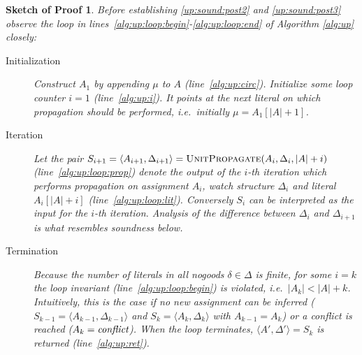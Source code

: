 \documentclass{vutinfth} %
\newtheorem{proof-sketch}{Sketch of Proof}[chapter]
\newcommand{\ass}{A}
\newcommand{\dpm}{\Delta^\pm}
\newcommand{\sgl}{\mu}
\begin{document}
\begin{proof-sketch}


Before establishing \ref{up:sound:post2} and \ref{up:sound:post3} observe the loop in lines~\ref{alg:up:loop:begin}-\ref{alg:up:loop:end} of Algorithm \ref{alg:up} closely:
\begin{description}
\item[Initialization] Construct $A_1$ by appending $\sgl$ to $\ass$ (line~\ref{alg:up:circ}). Initialize some loop counter $i = 1$ (line~\ref{alg:up:i}). It points at the next literal on which propagation should be performed, i.e.~initially $\sgl = \ass_1[|\ass| + 1]$. 

\item[Iteration] Let the pair $S_{i+1} = \langle \ass_{i+1}, \Delta_{i+1} \rangle = \textsc{UnitPropagate}(\ass_i, \Delta_i, |A| + i)$ (line~\ref{alg:up:loop:prop}) denote the output of the $i$-th iteration which performs propagation on assignment $\ass_i$, watch structure $\Delta_i$ and literal $\ass_i[|A| + i]$ (line~\ref{alg:up:loop:lit}). Conversely $S_i$ can be interpreted as the input for the $i$-th iteration. Analysis of the difference between $\Delta_{i}$ and $\Delta_{i+1}$ is what resembles soundness below.

\item[Termination] Because the number of literals in all nogoods $\delta \in \Delta$ is finite, for some $i = k$ the loop invariant (line~\ref{alg:up:loop:begin}) is violated, i.e.~$|\ass_{k}| < |A| + k$. Intuitively, this is the case if no new assignment can be inferred ($S_{k-1} = \langle \ass_{k-1}, \Delta_{k-1} \rangle$ and $S_k = \langle \ass_k, \Delta_k \rangle$ with $\ass_{k-1} = \ass_k$) or a conflict is reached ($\ass_k = \emph{conflict}$). When the loop terminates, $\langle \ass', \Delta' \rangle = S_k$ is returned (line~\ref{alg:up:ret}).
\end{description}


\end{proof-sketch}
\end{document}
